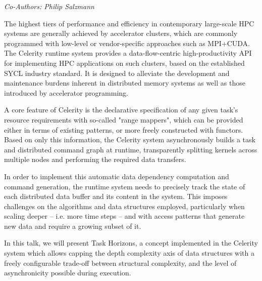 \begin{center}
\textit{Co-Authors: Philip Salzmann}
\end{center} 
The highest tiers of performance and efficiency in contemporary large-scale HPC systems are generally achieved by accelerator clusters, which are commonly programmed with low-level or vendor-specific approaches such as MPI+CUDA. The Celerity runtime system provides a data-flow-centric high-productivity API for implementing HPC applications on such clusters, based on the established SYCL industry standard. It is designed to alleviate the development and maintenance burdens inherent in distributed memory systems as well as those introduced by accelerator programming.

A core feature of Celerity is the declarative specification of any given task’s resource requirements with so-called "range mappers", which can be provided either in terms of existing patterns, or more freely constructed with functors. Based on only this information, the Celerity system asynchronously builds a task and distributed command graph at runtime, transparently splitting kernels across multiple nodes and performing the required data transfers.


In order to implement this automatic data dependency computation and command generation, the runtime system needs to precisely track the state of each distributed data buffer and its content in the system. This imposes challenges on the algorithms and data structures employed, particularly when scaling deeper -- i.e. more time steps -- and with access patterns that generate new data and require a growing subset of it.


In this talk, we will present Task Horizons, a concept implemented in the Celerity system which allows capping the depth complexity axis of data structures with a freely configurable trade-off between structural complexity, and the level of asynchronicity possible during execution. 